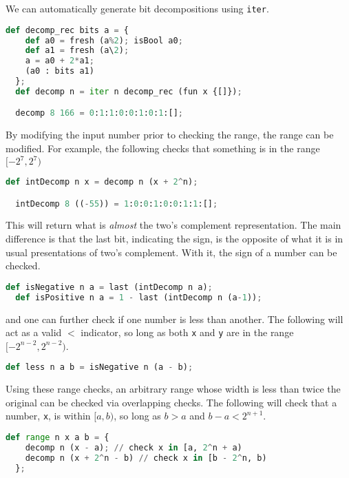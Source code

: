 We can automatically generate bit decompositions using \lstinline{iter}.

\begin{lstlisting}[language=Python]
  def decomp_rec bits a = {
    def a0 = fresh (a%2); isBool a0;
    def a1 = fresh (a\2);
    a = a0 + 2*a1;
    (a0 : bits a1)
  };
  def decomp n = iter n decomp_rec (fun x {[]});

  decomp 8 166 = 0:1:1:0:0:1:0:1:[];
\end{lstlisting}

By modifying the input number prior to checking the range, the range can be modified. For example, the following checks that something is in the range $[-2^7, 2^7)$

\begin{lstlisting}[language=Python]
  def intDecomp n x = decomp n (x + 2^n);

  intDecomp 8 ((-55)) = 1:0:0:1:0:0:1:1:[];
\end{lstlisting}

This will return what is \textit{almost} the two's complement representation. The main difference is that the last bit, indicating the sign, is the opposite of what it is in usual presentations of two's complement. With it, the sign of a number can be checked.

\begin{lstlisting}[language=Python]
  def isNegative n a = last (intDecomp n a);
  def isPositive n a = 1 - last (intDecomp n (a-1));
\end{lstlisting}

and one can further check if one number is less than another. The following will act as a valid $<$ indicator, so long as both \lstinline{x} and \lstinline{y} are in the range $[-2^{n-2}, 2^{n-2})$.

\begin{lstlisting}[language=Python]
  def less n a b = isNegative n (a - b);
\end{lstlisting}

Using these range checks, an arbitrary range whose width is less than twice the original can be checked via overlapping checks. The following will check that a number, \lstinline{x}, is within $[a, b)$, so long as $b > a$ and $b - a < 2^{n+1}$.

\begin{lstlisting}[language=Python]
  def range n x a b = {
    decomp n (x - a); // check x in [a, 2^n + a)
    decomp n (x + 2^n - b) // check x in [b - 2^n, b)
  };
\end{lstlisting}

